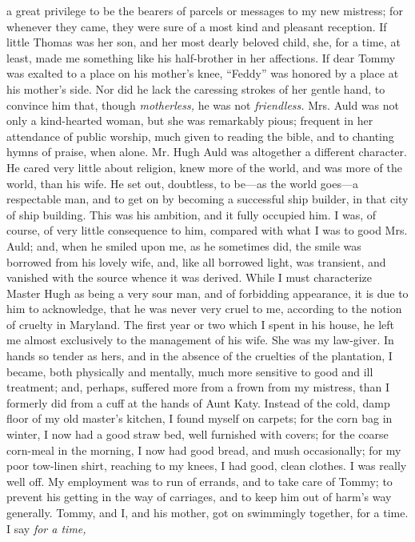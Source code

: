 a great privilege to be the bearers of parcels or messages to my new
mistress; for whenever they came, they were sure of a most kind and
pleasant reception. If little Thomas was her son, and her most dearly
beloved child, she, for a time, at least, made me something like his
half-brother in her affections. If dear Tommy was exalted to a place on
his mother's knee, ``Feddy'' was honored by a place at his mother's
side. Nor did he lack the caressing strokes of her gentle hand, to
convince him that, though \emph{motherless,} he was not
\emph{friendless.} Mrs. Auld was not only a kind-hearted woman, but she
was remarkably pious; frequent in her attendance of public worship, much
given to reading the bible, and to chanting hymns of praise, when alone.
Mr. Hugh Auld was altogether a different character. He cared very little
about religion, knew more of the world, and was more of the world, than
his wife. He set out, doubtless, to be---as the world goes---a
respectable man, and to get on by becoming a successful ship builder, in
that city of ship building. This was his ambition, and it fully occupied
him. I was, of course, of very little consequence to him, compared with
what I was to good Mrs. Auld; and, when he smiled upon me, as he
sometimes did, the smile was borrowed from his lovely wife, and, like
all borrowed light, was transient, and vanished with the source whence
it was derived. While I must characterize Master Hugh as being a very
sour man, and of forbidding appearance, it is due to him to acknowledge,
that he was never {}very cruel to me, according to the notion of cruelty
in Maryland. The first year or two which I spent in his house, he left
me almost exclusively to the management of his wife. She was my
law-giver. In hands so tender as hers, and in the absence of the
cruelties of the plantation, I became, both physically and mentally,
much more sensitive to good and ill treatment; and, perhaps, suffered
more from a frown from my mistress, than I formerly did from a cuff at
the hands of Aunt Katy. Instead of the cold, damp floor of my old
master's kitchen, I found myself on carpets; for the corn bag in winter,
I now had a good straw bed, well furnished with covers; for the coarse
corn-meal in the morning, I now had good bread, and mush occasionally;
for my poor tow-linen shirt, reaching to my knees, I had good, clean
clothes. I was really well off. My employment was to run of errands, and
to take care of Tommy; to prevent his getting in the way of carriages,
and to keep him out of harm's way generally. Tommy, and I, and his
mother, got on swimmingly together, for a time. I say \emph{for a time,}

